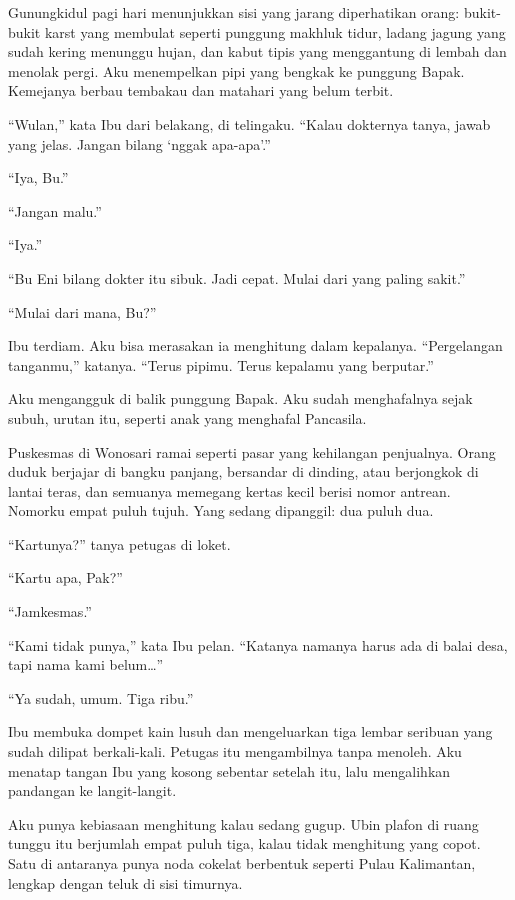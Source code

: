 \documentclass[11pt,twoside,openany]{book}
\makeatletter
\newcommand{\scenebreak}{\par\vspace{0.9em}{\centering\textsc{*\hspace{0.7em}*\hspace{0.7em}*}\par}\vspace{0.9em}\@afterindentfalse\@afterheading}
\makeatother
\begin{document}
Gunungkidul pagi hari menunjukkan sisi yang jarang diperhatikan orang: bukit-bukit karst yang membulat seperti punggung makhluk tidur, ladang jagung yang sudah kering menunggu hujan, dan kabut tipis yang menggantung di lembah dan menolak pergi. Aku menempelkan pipi yang bengkak ke punggung Bapak. Kemejanya berbau tembakau dan matahari yang belum terbit.

``Wulan,'' kata Ibu dari belakang, di telingaku. ``Kalau dokternya tanya, jawab yang jelas. Jangan bilang `nggak apa-apa'.''

``Iya, Bu.''

``Jangan malu.''

``Iya.''

``Bu Eni bilang dokter itu sibuk. Jadi cepat. Mulai dari yang paling sakit.''

``Mulai dari mana, Bu?''

Ibu terdiam. Aku bisa merasakan ia menghitung dalam kepalanya. ``Pergelangan tanganmu,'' katanya. ``Terus pipimu. Terus kepalamu yang berputar.''

Aku mengangguk di balik punggung Bapak. Aku sudah menghafalnya sejak subuh, urutan itu, seperti anak yang menghafal Pancasila.

\scenebreak
Puskesmas di Wonosari ramai seperti pasar yang kehilangan penjualnya. Orang duduk berjajar di bangku panjang, bersandar di dinding, atau berjongkok di lantai teras, dan semuanya memegang kertas kecil berisi nomor antrean. Nomorku empat puluh tujuh. Yang sedang dipanggil: dua puluh dua.

``Kartunya?'' tanya petugas di loket.

``Kartu apa, Pak?''

``Jamkesmas.''

``Kami tidak punya,'' kata Ibu pelan. ``Katanya namanya harus ada di balai desa, tapi nama kami belum\ldots{}''

``Ya sudah, umum. Tiga ribu.''

Ibu membuka dompet kain lusuh dan mengeluarkan tiga lembar seribuan yang sudah dilipat berkali-kali. Petugas itu mengambilnya tanpa menoleh. Aku menatap tangan Ibu yang kosong sebentar setelah itu, lalu mengalihkan pandangan ke langit-langit.

Aku punya kebiasaan menghitung kalau sedang gugup. Ubin plafon di ruang tunggu itu berjumlah empat puluh tiga, kalau tidak menghitung yang copot. Satu di antaranya punya noda cokelat berbentuk seperti Pulau Kalimantan, lengkap dengan teluk di sisi timurnya.
\end{document}
